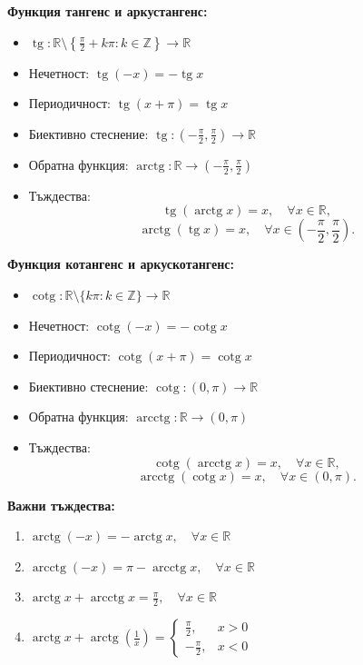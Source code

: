 \textbf{Функция тангенс и аркустангенс:}
\begin{itemize}
    \item $\operatorname{tg}: \mathbb{R} \setminus \left\{\frac{\pi}{2} + k\pi : k \in \mathbb{Z}\right\} \to \mathbb{R}$
    \item Нечетност: $\operatorname{tg}(-x) = -\operatorname{tg} x$
    \item Периодичност: $\operatorname{tg}(x+\pi) = \operatorname{tg} x$
    \item Биективно стеснение: $\operatorname{tg}: \left(-\frac{\pi}{2}, \frac{\pi}{2}\right) \to \mathbb{R}$
    \item Обратна функция: $\operatorname{arctg}: \mathbb{R} \to \left(-\frac{\pi}{2}, \frac{\pi}{2}\right)$
    \item Тъждества:
    \[
    \operatorname{tg}(\operatorname{arctg} x) = x, \quad \forall x \in \mathbb{R},
    \]
    \[
    \operatorname{arctg}(\operatorname{tg} x) = x, \quad \forall x \in \left(-\frac{\pi}{2}, \frac{\pi}{2}\right).
    \]
\end{itemize}

\textbf{Функция котангенс и аркускотангенс:}
\begin{itemize}
    \item $\operatorname{cotg}: \mathbb{R} \setminus \{k\pi : k \in \mathbb{Z}\} \to \mathbb{R}$
    \item Нечетност: $\operatorname{cotg}(-x) = -\operatorname{cotg} x$
    \item Периодичност: $\operatorname{cotg}(x+\pi) = \operatorname{cotg} x$
    \item Биективно стеснение: $\operatorname{cotg}: (0, \pi) \to \mathbb{R}$
    \item Обратна функция: $\operatorname{arcctg}: \mathbb{R} \to (0, \pi)$
    \item Тъждества:
    \[
    \operatorname{cotg}(\operatorname{arcctg} x) = x, \quad \forall x \in \mathbb{R},
    \]
    \[
    \operatorname{arcctg}(\operatorname{cotg} x) = x, \quad \forall x \in (0, \pi).
    \]
\end{itemize}

\textbf{Важни тъждества:}
\begin{enumerate}
    \item $\operatorname{arctg}(-x) = -\operatorname{arctg} x, \quad \forall x \in \mathbb{R}$
    \item $\operatorname{arcctg}(-x) = \pi - \operatorname{arcctg} x, \quad \forall x \in \mathbb{R}$
    \item $\operatorname{arctg} x + \operatorname{arcctg} x = \frac{\pi}{2}, \quad \forall x \in \mathbb{R}$
    \item $\operatorname{arctg} x + \operatorname{arctg}\left(\frac{1}{x}\right) = \begin{cases} \frac{\pi}{2}, & x > 0 \\ -\frac{\pi}{2}, & x < 0 \end{cases}$
\end{enumerate}

